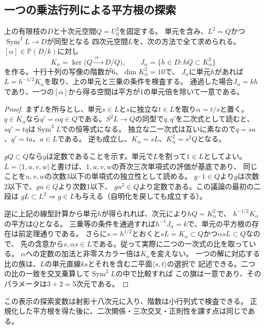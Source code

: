 \subsection{一つの乗法行列による平方根の探索}
\begin{proposition}[長さ20の環での比による復元]\label{prop:finite-square-ratio}
上の有限枝の$D$と十次元空間$Q=U_0^2$を固定する。
単元を含み、$L^2=Q$かつ$\operatorname{Sym}^3L\to D$が同型となる
四次元空間$L$を、次の方法で全て求められる。
$[\alpha]\in\mathbb P(D/k)$に対し
\[
 K_\alpha=\ker\bigl(Q\xrightarrow{\ \alpha\cdot\ }D/Q\bigr),\qquad
 J_\alpha=\{h\in D:hQ\subset K_\alpha^2\}
\]
を作る。十行十列の写像の階数が6、$\dim K_\alpha^2=10$で、
$J_\alpha$に単元$h$があれば$L=h^{-1/2}K_\alpha$を取り、上の単元と三乗の条件を検査する。
通過した場合$J_\alpha=kh$であり、一つの$[\alpha]$から得る空間は平方が1の単元倍を除いて一意である。
\end{proposition}
\begin{proof}
まず$L$を所与とし、単元$s\in L$と$s$に独立な$t\in L$を取り$\alpha=t/s$と置く。
$q\in K_\alpha$なら$q'=\alpha q\in Q$である。$S^2L\to Q$の同型で$q,q'$を二次式として読むと、
$sq'=tq$は$\operatorname{Sym}^3 L$での恒等式になる。
独立な二一次式は互いに素なので$q=s a$、$q'=t a$、$a\in L$である。
逆も成立し、$K_\alpha=sL$、$K_\alpha^2=s^2 Q$となる。

$gQ\subset Q$なら$g$は定数であることを示す。単元で$L$を割って$1\in L$としてよい。
$L=\langle 1,u,v,w\rangle$と書けば、$1,u,v,w$の斉次三次単項式の評価が基底であり、
同じことを$u,v,w$の次数3以下の単項式の独立性として読める。
$g\cdot1\in Q$より$g$は次数2以下で、$gu\in Q$より次数1以下、
$gu^2\in Q$より定数である。この議論の最初の二段は
$gL\subset L^2\Rightarrow g\in L$も与える（自明化を戻しても成立する）。

逆に上記の線型計算から単元$h$が得られれば、次元により$hQ=K_\alpha^2$で、
$h^{-1/2}K_\alpha$の平方は$Q$となる。
三乗等の条件を通過すれば$h^{-1}J_\alpha=k$で、単元の平方根の存在は前定理通りである。
さらに$s=h^{1/2}$とおくと$sL=K_\alpha\subset Q$かつ$\alpha sL\subset Q$なので、
先の含意から$s,\alpha s\in L$である。従って実際に二つの一次式の比を取っている。
$\alpha$への定数の加法と非零スカラー倍は$K_\alpha$を変えない。
一つの解に対応する比の族は、$L$の単元直線$ks$とそれを含む二平面$\langle s,t\rangle$の選択で
記述できる。二つの比の一致を交叉乗算して$\operatorname{Sym}^2L$の中で比較すれば
この旗は一意であり、そのパラメータは$3+2=5$次元である。
\end{proof}
この表示の探索変数は射影十八次元に入り、階数は小行列式で検査できる。
正規化した平方根を得た後に、二次関係・三次交叉・正則性を課す点は同じである。

